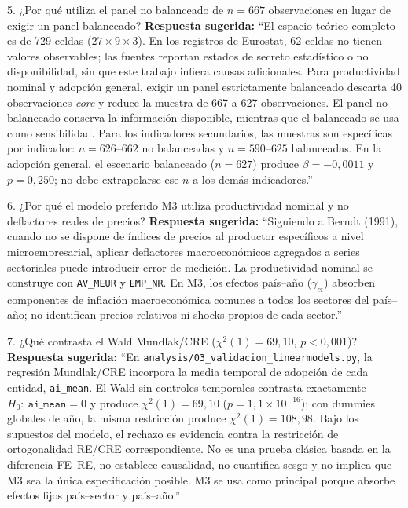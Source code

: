\documentclass[11pt,a4paper]{article}
\begin{document}
\begin{qbox}{5. ¿Por qué utiliza el panel no balanceado de $n=667$ observaciones en lugar de exigir un panel balanceado?}
\textbf{Respuesta sugerida:}  
``El espacio teórico completo es de 729 celdas ($27 \times 9 \times 3$). En los registros de Eurostat, 62 celdas no tienen valores observables; las fuentes reportan estados de secreto estadístico o no disponibilidad, sin que este trabajo infiera causas adicionales. Para productividad nominal y adopción general, exigir un panel estrictamente balanceado descarta 40 observaciones \textit{core} y reduce la muestra de 667 a 627 observaciones. El panel no balanceado conserva la información disponible, mientras que el balanceado se usa como sensibilidad. Para los indicadores secundarios, las muestras son específicas por indicador: $n=626\text{--}662$ no balanceadas y $n=590\text{--}625$ balanceadas. En la adopción general, el escenario balanceado ($n=627$) produce $\beta = -0{,}0011$ y $p = 0{,}250$; no debe extrapolarse ese $n$ a los demás indicadores.''
\end{qbox}

\vspace{0.2cm}

\begin{qbox}{6. ¿Por qué el modelo preferido M3 utiliza productividad nominal y no deflactores reales de precios?}
\textbf{Respuesta sugerida:}  
``Siguiendo a Berndt (1991), cuando no se dispone de índices de precios al productor específicos a nivel microempresarial, aplicar deflactores macroeconómicos agregados a series sectoriales puede introducir error de medición. La productividad nominal se construye con \texttt{AV\_MEUR} y \texttt{EMP\_NR}. En M3, los efectos país--año ($\gamma_{ct}$) absorben componentes de inflación macroeconómica comunes a todos los sectores del país--año; no identifican precios relativos ni shocks propios de cada sector.''
\end{qbox}

\vspace{0.2cm}

\begin{qbox}{7. ¿Qué contrasta el Wald Mundlak/CRE ($\chi^2(1)=69{,}10$, $p<0{,}001$)?}
\textbf{Respuesta sugerida:}  
``En \texttt{analysis/03\_validacion\_linearmodels.py}, la regresión Mundlak/CRE incorpora la media temporal de adopción de cada entidad, \texttt{ai\_mean}. El Wald sin controles temporales contrasta exactamente $H_0:\ \texttt{ai\_mean}=0$ y produce $\chi^2(1)=69{,}10$ ($p=1{,}1\times10^{-16}$); con dummies globales de año, la misma restricción produce $\chi^2(1)=108{,}98$. Bajo los supuestos del modelo, el rechazo es evidencia contra la restricción de ortogonalidad RE/CRE correspondiente. No es una prueba clásica basada en la diferencia FE--RE, no establece causalidad, no cuantifica sesgo y no implica que M3 sea la única especificación posible. M3 se usa como principal porque absorbe efectos fijos país--sector y país--año.''
\end{qbox}
\end{document}
